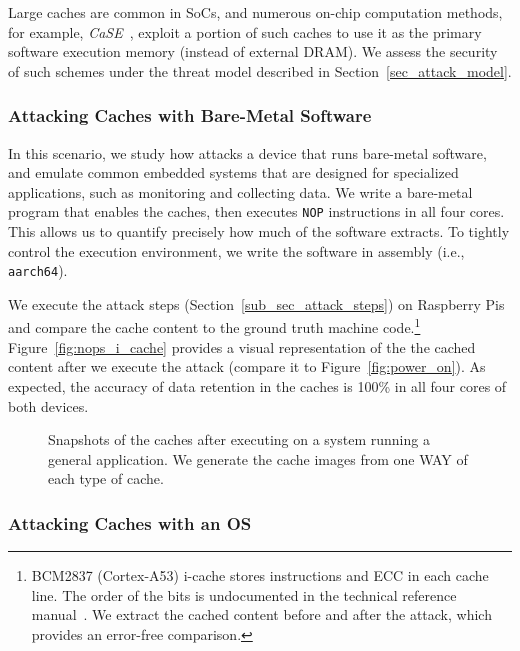 Large caches are common in SoCs, and numerous on-chip computation methods, for example, \textit{CaSE}~\cite{zhang2016case}, exploit a portion of such caches to use it as the primary software execution memory (instead of external DRAM). 
We assess the security of such schemes under the threat model described in Section~\ref{sec_attack_model}.

\subsubsection{Attacking Caches with Bare-Metal Software}

In this scenario, we study how \sys{} attacks a device that runs bare-metal software, and emulate common embedded systems that are designed for specialized applications, such as monitoring and collecting data. 
We write a bare-metal program that enables the caches, then executes \texttt{NOP} instructions in all four cores.
This allows us to quantify precisely how much of the software \sys{} extracts.  
To tightly control the execution environment, we write the software in assembly (i.e., \texttt{aarch64}). 

We execute the attack steps (Section~\ref{sub_sec_attack_steps}) on Raspberry Pis and compare the cache content to the ground truth machine code.\footnote{BCM2837 (Cortex-A53) i-cache stores instructions and ECC in each cache line. The order of the bits is undocumented in the technical reference manual~\cite{a53Trm}.
We extract the cached content before and after the attack, which provides an error-free comparison.}
Figure~\ref{fig:nops_i_cache} provides a visual representation of the the cached content after we execute the attack (compare it to Figure~\ref{fig:power_on}).
As expected, the accuracy of data retention in the caches is 100\% in all four cores of both devices.

\begin{figure}
    \centering
    \hfill
    \caption{Snapshots of the caches after executing \sys{} on a system running a general application. We generate the cache images from one WAY of each type of cache.}
    \label{fig:software_cache_on_os}
\end{figure}

\subsubsection{Attacking Caches with an OS}

